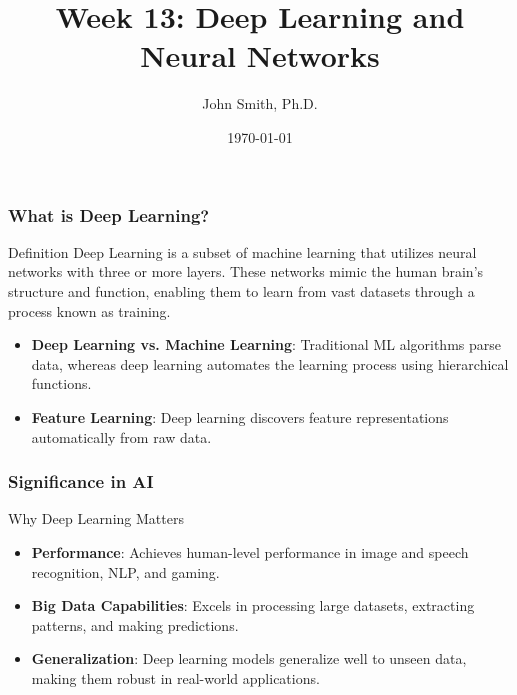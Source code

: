 \documentclass[aspectratio=169]{beamer}
\title[Deep Learning and Neural Networks]{Week 13: Deep Learning and Neural Networks}
\author[J. Smith]{John Smith, Ph.D.}
\institute[University Name]{
  Department of Computer Science\\
  University Name\\
  \vspace{0.3cm}
  Email: email@university.edu\\
  Website: www.university.edu
}
\date{\today}
\begin{document}
\frame{\titlepage}

\begin{frame}[fragile]
  \titlepage
\end{frame}

\begin{frame}[fragile]
    \frametitle{What is Deep Learning?}
    \begin{block}{Definition}
        Deep Learning is a subset of machine learning that utilizes neural networks with three or more layers. These networks mimic the human brain's structure and function, enabling them to learn from vast datasets through a process known as training.
    \end{block}
    
    \begin{itemize}
        \item \textbf{Deep Learning vs. Machine Learning}: 
        Traditional ML algorithms parse data, whereas deep learning automates the learning process using hierarchical functions.
        \item \textbf{Feature Learning}: 
        Deep learning discovers feature representations automatically from raw data.
    \end{itemize}
\end{frame}

\begin{frame}[fragile]
    \frametitle{Significance in AI}
    \begin{block}{Why Deep Learning Matters}
        \begin{itemize}
            \item \textbf{Performance}: Achieves human-level performance in image and speech recognition, NLP, and gaming.
            \item \textbf{Big Data Capabilities}: Excels in processing large datasets, extracting patterns, and making predictions.
            \item \textbf{Generalization}: Deep learning models generalize well to unseen data, making them robust in real-world applications.
        \end{itemize}
    \end{block}
\end{frame}
\end{document}
